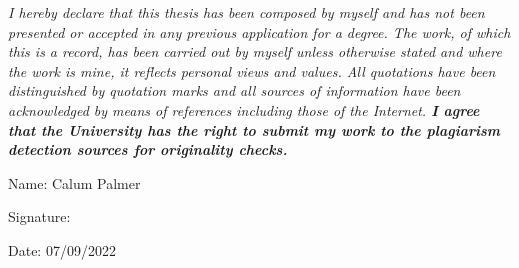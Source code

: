 \documentclass[12pt,a4 paper]{report}
\begin{document}
    \emph{I hereby declare that this thesis has been composed by myself and has not been
    presented or accepted in any previous application for a degree. The work, of which
    this is a record, has been carried out by myself unless otherwise stated and where
    the work is mine, it reflects personal views and values. All quotations have been
    distinguished by quotation marks and all sources of information have been
    acknowledged by means of references including those of the Internet.
    \textbf{I agree that the University has the right to submit my work to the plagiarism
    detection sources for originality checks.}}

    \vspace{2cm}
        {\noindent\large Name: Calum Palmer}

    \vspace{0.5cm}
        {\noindent\large Signature: }

    \vspace{0.5cm}
        {\noindent\large Date: 07/09/2022}

    \newpage
    \tableofcontents
    \listoffigures
    \listoftables
    \newpage

    

    

    

    

    


    
    
\end{document}
